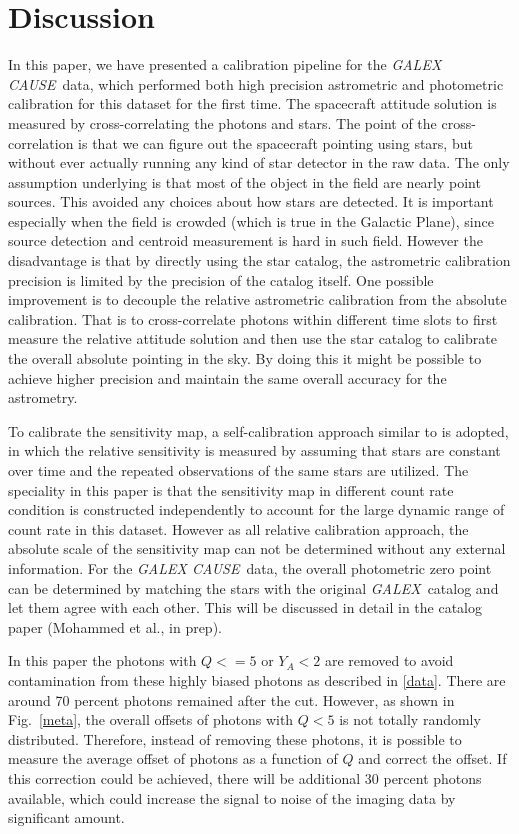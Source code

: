\documentclass[12pt, preprint]{aastex61}
\newcommand{\project}[1]{\textsl{#1}}
\newcommand{\galex}{\project{GALEX}}
\newcommand{\cause}{\project{GALEX CAUSE}}
\begin{document}
\section{Discussion}
\label{ds}

In this paper, we have presented a calibration pipeline for the \cause\ data, which performed both high precision astrometric and photometric calibration for this dataset for the first time.
The spacecraft attitude solution is measured by cross-correlating the photons and stars.
The point of the cross-correlation is that we can figure out the spacecraft pointing using stars, but without ever actually running any kind of star detector in the raw data.
The only assumption underlying is that most of the object in the field are nearly point sources.
This avoided any choices about how stars are detected.
It is important especially when the field is crowded (which is true in the Galactic Plane), since source detection and centroid measurement is hard in such field.
However the disadvantage is that by directly using the star catalog, the astrometric calibration precision is limited by the precision of the catalog itself.
One possible improvement is to decouple the relative astrometric calibration from the absolute calibration.
That is to cross-correlate photons within different time slots to first measure the relative attitude solution and then use the star catalog to calibrate the overall absolute pointing in the sky.
By doing this it might be possible to achieve higher precision and maintain the same overall accuracy for the astrometry.

To calibrate the sensitivity map, a self-calibration approach similar to \cite{uber} is adopted, in which the relative sensitivity is measured by assuming that stars are constant over time and the repeated observations of the same stars are utilized. 
The speciality in this paper is that the sensitivity map in different count rate condition is constructed independently to account for the large dynamic range of count rate in this dataset.
However as all relative calibration approach, the absolute scale of the sensitivity map can not be determined without any external information.
For the \cause\ data, the overall photometric zero point can be determined by matching the stars with the original \galex\ catalog and let them agree with each other.
This will be discussed in detail in the catalog paper (Mohammed et al., in prep).

In this paper the photons with $Q<=5$ or $Y_A<2$ are removed to avoid contamination from these highly biased photons as described in \ref{data}.
There are around 70 percent photons remained after the cut.
However, as shown in Fig.~\ref{meta}, the overall offsets of photons with $Q<5$ is not totally randomly distributed.
Therefore, instead of removing these photons, it is possible to measure the average offset of photons as a function of $Q$ and correct the offset.
If this correction could be achieved, there will be additional 30 percent photons available, which could increase the signal to noise of the imaging data by significant amount.
\end{document}
